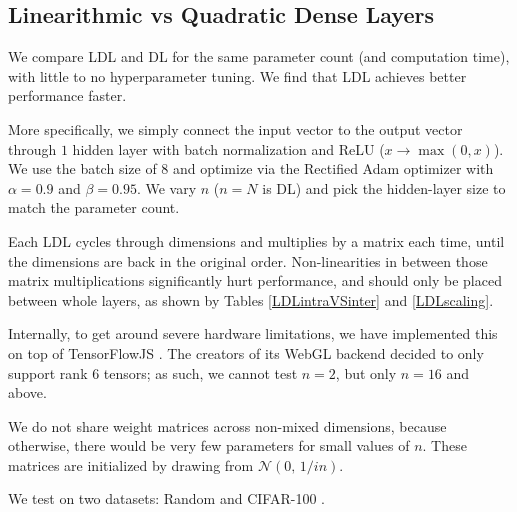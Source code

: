 \documentclass{article}
\begin{document}
\subsection{Linearithmic vs Quadratic Dense Layers}

We compare LDL and DL for the same parameter count (and computation time), with little to no hyperparameter tuning. We find that LDL achieves better performance faster.

More specifically, we simply connect the input vector to the output vector through $1$ hidden layer with batch normalization \cite{ioffe2015batch} and ReLU ($x \rightarrow \max(0,x)$). We use the batch size of $8$ and optimize via the Rectified Adam optimizer \cite{liu2019radam} with $\alpha=0.9$ and $\beta=0.95$. We vary $n$ ($n=N$ is DL) and pick the hidden-layer size to match the parameter count.

Each LDL cycles through dimensions and multiplies by a matrix each time, until the dimensions are back in the original order. Non-linearities in between those matrix multiplications significantly hurt performance, and should only be placed between whole layers, as shown by Tables \ref{LDLintraVSinter} and \ref{LDLscaling}.

Internally, to get around severe hardware limitations, we have implemented this on top of TensorFlowJS \cite{tensorflow2015-whitepaper}. The creators of its WebGL backend decided to only support rank $6$ tensors; as such, we cannot test $n=2$, but only $n=16$ and above.

We do not share weight matrices across non-mixed dimensions, because otherwise, there would be very few parameters for small values of $n$. These matrices are initialized by drawing from $\mathcal{N}(0,\,1/in)$.

We test on two datasets: Random and CIFAR-100 \cite{Krizhevsky09learningmultiple}.
\end{document}
